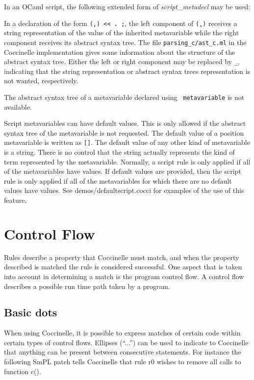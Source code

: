 In an OCaml script, the following extended form of \textit{script\_metadecl}
may be used:

\begin{grammar}
\end{grammar}

\noindent
In a declaration of the form \texttt{(,) <{}<
  . ;}, the left component of \texttt{(,)}
receives a string representation of the value of the inherited metavariable
while the right component receives its abstract syntax tree.  The file
\texttt{parsing\_c/ast\_c.ml} in the Coccinelle implementation gives some
information about the structure of the abstract syntax tree.  Either the
left or right component may be replaced by \verb+_+, indicating that the
string representation or abstract syntax trees representation is not
wanted, respectively.

The abstract syntax tree of a metavariable declared using {\tt
  metavariable} is not available.

Script metavariables can have default values.  This is only allowed if the
abstract syntax tree of the metavariable is not requested.  The default
value of a position metavariable is written as {\tt []}.  The default value
of any other kind of metavariable is a string.  There is no control that
the string actually represents the kind of term represented by the
metavariable.  Normally, a script rule is only applied if all of the
metavariables have values.  If default values are provided, then the script
rule is only applied if all of the metavariables for which there are no
default values have values.  See demos/defaultscript.cocci for examples of
the use of this feature.

\section{Control Flow}

Rules describe a property that Coccinelle must match, and when the
property described is matched the rule is considered successful. One aspect
that is taken into account in determining a match is the program control
flow. A control flow describes a possible run time path taken by a program.

\subsection{Basic dots}
When using Coccinelle, it is possible to express matches of certain code
within certain types of control flows. Ellipses (``...'') can be used to
indicate to Coccinelle that anything can be present between consecutive
statements. For instance the following SmPL patch tells Coccinelle that
rule r0 wishes to remove all calls to function c().

